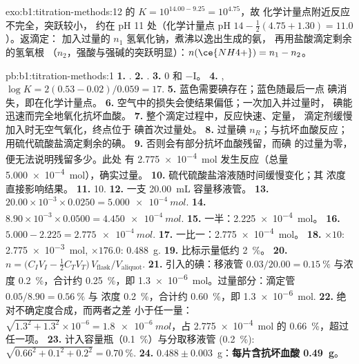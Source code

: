 \begin{solution}{exo:b1:titration-methods:12}
 的 $K = 10^{14.00 - 9.25} = 10^{4.75}$，故
化学计量点附近反应不完全，突跃较小，
约在 pH 11 处（化学计量点 pH $14 - \frac12(4.75 + 1.30) = 11.0$）。返滴定：
加入过量的 $n_1$ 氢氧化钠，煮沸以逸出生成的氨，
再用盐酸滴定剩余的氢氧根
（$n_2$，强酸与强碱的突跃明显）：$n(\ce{NH4+}) = n_1 - n_2$。
\end{solution}

\begin{solution}{pb:b1:titration-methods:1}
\textbf{1.} .
\textbf{2.} .
\textbf{3.} 0 和 $-$I。
\textbf{4.} , $\log K = 2(0.53 - 0.02)/0.059
= 17$.
\textbf{5.} 蓝色需要碘存在；蓝色随最后一点
碘消失，即在化学计量点。
\textbf{6.} 空气中的损失会使结果偏低；一次加入并过量时，
碘能迅速而完全地氧化抗坏血酸。
\textbf{7.} 整个滴定过程中，反应快速、定量，
滴定剂缓慢加入时无空气氧化，终点位于
碘首次过量处。
\textbf{8.} 过量碘 $n_R$；与抗坏血酸反应；
用硫代硫酸盐滴定剩余的碘。
\textbf{9.} 否则会有部分抗坏血酸残留，而碘
的过量为零，便无法说明残留多少。此处
有 \qty{2.775e-4}{mol} 发生反应（总量 \qty{5.000e-4}{mol}），确实过量。
\textbf{10.} 硫代硫酸盐溶液随时间缓慢变化；其
浓度直接影响结果。
\textbf{11.} 10.
\textbf{12.} 一支 \qty{20.00}{mL} 容量移液管。
\textbf{13.} $20.00 \times 10^{-3} \times 0.0250 = \qty{5.000e-4}{mol}$.
\textbf{14.} $8.90 \times 10^{-3} \times 0.0500 = \qty{4.450e-4}{mol}$.
\textbf{15.} 一半：\qty{2.225e-4}{mol}。
\textbf{16.} $5.000 - 2.225 = \qty{2.775e-4}{mol}$.
\textbf{17.} 一比一：\qty{2.775e-4}{mol}。
\textbf{18.} $\times 10$: \qty{2.775e-3}{mol}, $\times 176.0$:
\qty{0.488}{g}.
\textbf{19.} 比标示量低约 \qty{2}{\percent}。
\textbf{20.} $n = \bigl(C_IV_I - \frac12C_TV_T\bigr)\,V_{\mathrm{flask}}/V_{\mathrm{aliquot}}$.
\textbf{21.} 引入的碘：移液管 $0.03/20.00 = \qty{0.15}{\percent}$
与浓度 \qty{0.2}{\percent}，合计约 \qty{0.25}{\percent}，即
\qty{1.3e-6}{mol}。过量部分：滴定管 $0.05/8.90 = \qty{0.56}{\percent}$ 与
浓度 \qty{0.2}{\percent}，合计约 \qty{0.60}{\percent}，即
\qty{1.3e-6}{mol}.
\textbf{22.} 绝对不确定度合成，而两者之差
小于任一量：$\sqrt{1.3^2 + 1.3^2} \times 10^{-6} =
\qty{1.8e-6}{mol}$，占 \qty{2.775e-4}{mol} 的 \qty{0.66}{\percent}，超过
任一项。
\textbf{23.} 计入容量瓶（\qty{0.1}{\percent}）与分取移液管
(\qty{0.2}{\percent}): $\sqrt{0.66^2 + 0.1^2 + 0.2^2} = \qty{0.70}{\percent}$.
\textbf{24.} $0.488 \pm 0.003$~g：\textbf{每片含抗坏血酸
\qty{0.49}{g}}。
\end{solution}
